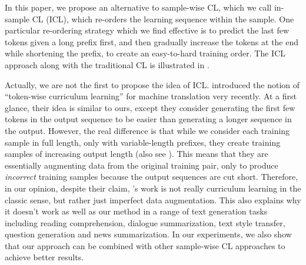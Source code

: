 In this paper, we propose an alternative to sample-wise CL, which we call 
in-sample CL (ICL), which re-orders the learning sequence within the sample. 
One particular re-ordering strategy which we find effective is to predict the 
last few tokens given a long prefix first, and then gradually increase the tokens
at the end while shortening the prefix, to create an easy-to-hard training
order. The ICL approach along with the traditional CL is illustrated in 
. 

Actually, we are not the first to propose the idea of ICL.
\citet{liang-etal-2021-token-wise} introduced the notion of ``token-wise curriculum
learning'' for machine translation very recently. At a first glance,
their idea is similar to ours, except they consider generating the first few tokens
in the output sequence to be easier than generating a longer sequence in the output. 
However, the real difference is that while we consider each training sample in full
length, only with variable-length prefixes, they create training samples of increasing
output length (also see ). 
This means that they are essentially augmenting data from the original
training pair, only to produce \textit{incorrect} training samples because the output
sequences are cut short. Therefore, in our opinion, despite
their claim, \citeauthor{liang-etal-2021-token-wise}'s work is not really curriculum 
learning in the classic sense, but rather just imperfect data augmentation.
This also explains why it doesn't work as well as our method in a range of
text generation tasks including reading comprehension,
dialogue summarization, text style transfer, question generation and 
news summarization. In our experiments, we also show that our approach can be
combined with other sample-wise CL approaches to achieve better results.

